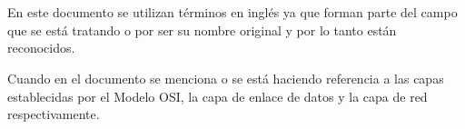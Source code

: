\chapter*{\nomeanexonotas}
\label{chap:notas}
\begin{description}
    \item En este documento se utilizan términos en inglés ya que forman parte del campo que se está tratando o por ser su nombre original y por lo tanto están reconocidos.
    \item Cuando en el documento se menciona  o  se está haciendo referencia a las capas establecidas por el Modelo OSI, la capa de enlace de datos y la capa de red respectivamente.
\end{description}